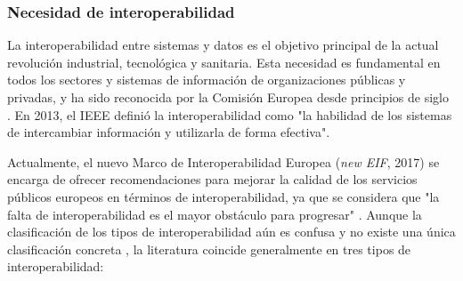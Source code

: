 \begin{enumerate}
\end{enumerate}

\subsubsection{Necesidad de interoperabilidad}


La interoperabilidad entre sistemas y datos es el objetivo principal de la actual revolución industrial, tecnológica y sanitaria. Esta necesidad es fundamental en todos los sectores y sistemas de información de organizaciones públicas y privadas, y ha sido reconocida por la Comisión Europea desde principios de siglo \cite{CEU1999ida}. En 2013, el IEEE definió la interoperabilidad como "la habilidad de los sistemas de intercambiar información y utilizarla de forma efectiva". 

Actualmente, el nuevo Marco de Interoperabilidad Europea (\textit{new EIF}, 2017) se encarga de ofrecer recomendaciones para mejorar la calidad de los servicios públicos europeos en términos de interoperabilidad, ya que se considera que "la falta de interoperabilidad es el mayor obstáculo para progresar" \cite{kouroubali2019new}. Aunque la clasificación de los tipos de interoperabilidad aún es confusa y no existe una única clasificación concreta \cite{santos2021interoperability}, la literatura coincide generalmente en tres tipos de interoperabilidad:

